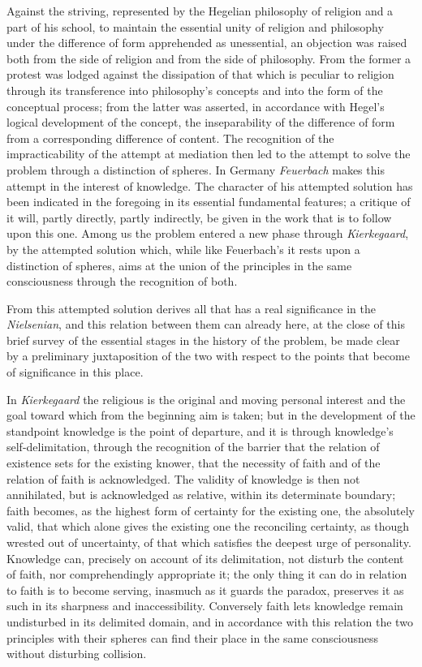 \documentclass[12pt,a4paper]{book}
\begin{document}
Against the striving, represented by the Hegelian philosophy of religion and a
part of his school, to maintain the essential unity of religion and philosophy
under the difference of form apprehended as unessential, an objection was raised
both from the side of religion and from the side of philosophy. From the
former a protest was lodged against the dissipation of that which is peculiar
to religion through its transference into philosophy's concepts and into the
form of the conceptual process; from the latter was asserted, in accordance
with Hegel's logical development of the concept, the inseparability of
the difference of form from a corresponding difference of content. The
recognition of the impracticability of the attempt at mediation then led to
the attempt to solve the problem through a distinction of spheres. In Germany
\emph{Feuerbach} makes this attempt in the interest of knowledge. The character of his
attempted solution has been indicated in the foregoing in its essential
fundamental features; a critique of it will, partly directly, partly
indirectly, be given in the work that is to follow upon this one. Among us the
problem entered a new phase through \emph{Kierkegaard}, by the attempted solution
which, while like Feuerbach's it rests upon a distinction of spheres, aims at
the union of the principles in the same consciousness through the recognition
of both.

From this attempted solution derives all that has a real significance in the
\emph{Nielsenian}, and this relation between them can already here, at the close of
this brief survey of the essential stages in the history of the problem, be
made clear by a preliminary juxtaposition of the two with respect to the
points that become of significance in this place.

In \emph{Kierkegaard} the religious is the original and moving personal interest and
the goal toward which from the beginning aim is taken; but in the development
of the standpoint knowledge is the point of departure, and it is through
knowledge's self-delimitation, through the recognition of the barrier that the
relation of existence sets for the existing knower, that the necessity of
faith and of the relation of faith is acknowledged. The validity of knowledge
is then not annihilated, but is acknowledged as relative, within its
determinate boundary; faith becomes, as the highest form of certainty for the
existing one, the absolutely valid, that which alone gives the existing one
the reconciling certainty, as though wrested out of uncertainty, of that which
satisfies the deepest urge of personality. Knowledge can, precisely on account
of its delimitation, not disturb the content of faith, nor comprehendingly
appropriate it; the only thing it can do in relation to faith is to become
serving, inasmuch as it guards the paradox, preserves it as such in its
sharpness and inaccessibility. Conversely faith lets knowledge remain
undisturbed in its delimited domain, and in accordance with this relation the
two principles with their spheres can find their place in the same
consciousness without disturbing collision.
\end{document}
